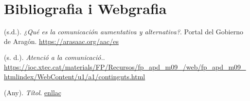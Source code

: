 \chapter*{Bibliografia i Webgrafia}


\begin{description}[style=unboxed, leftmargin=0cm, itemsep=1em]

    \item[ARASAAC.] (s.d.). \textit{¿Qué es la comunicación aumentativa y alternativa?}. Portal del Gobierno de Aragón. \url{https://arasaac.org/aac/es}

    \item[Institut Obert de Catalunya.] (s. d.). \textit{Atenció a la comunicació.}. \url{https://ioc.xtec.cat/materials/FP/Recursos/fp_apd_m09_/web/fp_apd_m09_htmlindex/WebContent/u1/a1/continguts.html}

    \item[Pàgina] (Any). \textit{Títol}. \url{enllaç}

\end{description}
